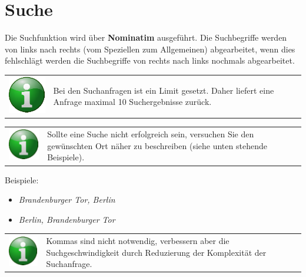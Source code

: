 \documentclass[10pt]{scrreprt}
\begin{document}
\vspace{3mm}
\section{Suche}
Die Suchfunktion wird über \textbf{Nominatim}  ausgeführt. Die Suchbegriffe werden von links nach rechts (vom Speziellen zum Allgemeinen) abgearbeitet, wenn dies fehlschlägt werden die Suchbegriffe von rechts nach links nochmals abgearbeitet.\\

\vspace{3mm}
\begin{tabular}{>{\centering \arraybackslash}m{1cm} m{14cm}}
\includegraphics[scale=0.5]{images/info.eps} & Bei den Suchanfragen ist ein Limit gesetzt. Daher liefert eine Anfrage maximal 10 Suchergebnisse zurück. \\ 
\end{tabular} 

\vspace{3mm}
\begin{tabular}{>{\centering \arraybackslash}m{1cm} m{14cm}}
\includegraphics[scale=0.5]{images/info.eps} & Sollte eine Suche nicht erfolgreich sein, versuchen Sie den gewünschten Ort näher zu beschreiben (siehe unten stehende Beispiele). \\ 
\end{tabular}

\vspace{3mm}
Beispiele: 
\begin{itemize}
\item \textit{Brandenburger Tor, Berlin}
\item \textit{Berlin, Brandenburger Tor}
\end{itemize}

\vspace{3mm}
\begin{tabular}{>{\centering \arraybackslash}m{1cm} m{14cm}}
\includegraphics[scale=0.5]{images/info.eps} & Kommas sind nicht notwendig, verbessern aber die Suchgeschwindigkeit durch Reduzierung der Komplexität der Suchanfrage.  \\ 
\end{tabular} 
\end{document}
